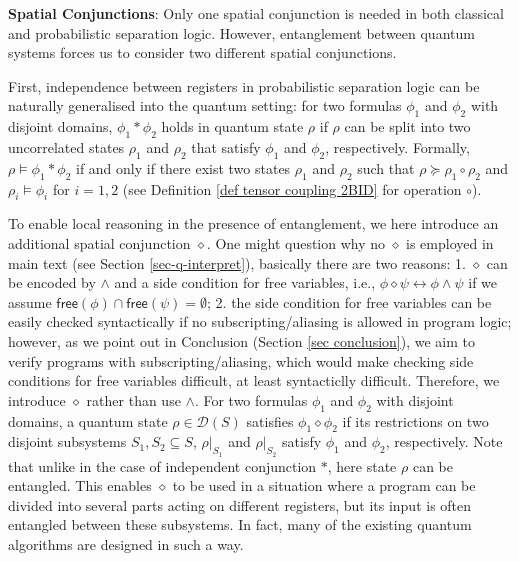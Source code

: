 \documentclass[conference,compsoc, 10pt]{IEEEtran}
\newcommand {\cD } {{\mathcal{D}}}
\newcommand {\free }[1] {{\mathsf{free}\left(#1\right)}}
\newcommand {\rt }[2] {{\left.{#1}\right|_{#2}}}
\newcommand{\sd}{\diamond}%
\begin{document}
\begin{appendices}
		{\vskip 3pt}
		
		\noindent\textbf{Spatial Conjunctions}: Only one spatial conjunction is needed in both classical and probabilistic separation logic. However, entanglement between quantum systems forces us to consider two different spatial conjunctions. 
		
		First, independence between registers in probabilistic separation logic \cite{BHL19} can be naturally generalised into the quantum setting: for two formulas $\phi_1$ and $\phi_2$ with disjoint domains, $\phi_1\ast\phi_2$ holds in quantum state $\rho$ if $\rho$ can be split into two uncorrelated states $\rho_1$ and $\rho_2$ that satisfy $\phi_1$ and $\phi_2$, respectively. Formally, $\rho\models\phi_1\ast\phi_2$ if and only if there exist two states $\rho_1$ and $\rho_2$ such that $\rho\succeq\rho_1\circ\rho_2$ and $\rho_i\models\phi_i$ for $i=1,2$ (see Definition \ref{def tensor coupling 2BID} for operation $\circ$). 
		
		To enable local reasoning in the presence of entanglement, we here introduce an additional spatial conjunction $\sd $. One might question why no $\sd$ is employed in main text (see Section \ref{sec-q-interpret}), basically there are two reasons:
		1. $\sd$ can be encoded by $\wedge$ and a side condition for free variables, i.e., $\phi\sd\psi\leftrightarrow\phi\wedge\psi$ if we assume $\free {\phi}\cap\free{\psi} = \emptyset$; 2. the side condition for free variables can be easily checked syntactically if no subscripting/aliasing is allowed in program logic; however, as we point out in Conclusion (Section \ref{sec conclusion}), we aim to verify programs with subscripting/aliasing, which would make checking side conditions for free variables difficult, at least syntacticlly difficult. Therefore, we introduce $\sd$ rather than use $\wedge$.
		For two formulas $\phi_1$ and $\phi_2$ with disjoint domains, a quantum state $\rho\in\cD(S)$ satisfies $\phi_1\sd\phi_2$ if its restrictions on two disjoint subsystems $S_1,S_2\subseteq S$, $\rt{\rho}{S_1}$ and $\rt{\rho}{S_2}$ satisfy $\phi_1$ and $\phi_2$, respectively. 
		Note that unlike in the case of independent conjunction $\ast$, here state $\rho$ can be entangled. This enables $\sd$ to be used in a situation where a program can be divided into several parts acting on different registers, but its input is often entangled between these subsystems. In fact, many of the existing quantum algorithms are designed in such a way. 
		

\end{appendices}
\end{document}
